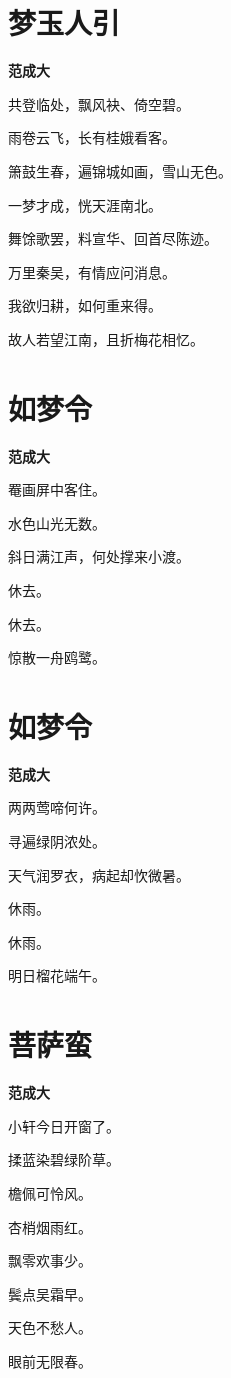 \documentclass[12pt,a4paper]{ctexbook}
\begin{document}
\section{梦玉人引}
\textbf{范成大}\par\vspace{0.5em}
共登临处，飘风袂、倚空碧。\par
雨卷云飞，长有桂娥看客。\par
箫鼓生春，遍锦城如画，雪山无色。\par
一梦才成，恍天涯南北。\par
舞馀歌罢，料宣华、回首尽陈迹。\par
万里秦吴，有情应问消息。\par
我欲归耕，如何重来得。\par
故人若望江南，且折梅花相忆。\par

\section{如梦令}
\textbf{范成大}\par\vspace{0.5em}
罨画屏中客住。\par
水色山光无数。\par
斜日满江声，何处撑来小渡。\par
休去。\par
休去。\par
惊散一舟鸥鹭。\par

\section{如梦令}
\textbf{范成大}\par\vspace{0.5em}
两两莺啼何许。\par
寻遍绿阴浓处。\par
天气润罗衣，病起却忺微暑。\par
休雨。\par
休雨。\par
明日榴花端午。\par

\section{菩萨蛮}
\textbf{范成大}\par\vspace{0.5em}
小轩今日开窗了。\par
揉蓝染碧绿阶草。\par
檐佩可怜风。\par
杏梢烟雨红。\par
飘零欢事少。\par
鬓点吴霜早。\par
天色不愁人。\par
眼前无限春。\par
\end{document}
